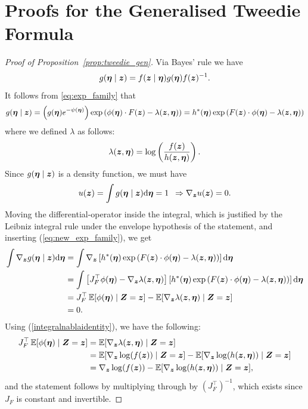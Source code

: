\documentclass{article}
\def\E{\mathbb{E}}
\def\dd{\mathrm{d}}
\def\tp{\top}
\theoremstyle{definition}
\begin{document}
\section{Proofs for the Generalised Tweedie Formula}\label{app:tweedie-proofs}
\begin{proof}[Proof of Proposition~\ref{prop:tweedie_gen}]
    Via Bayes' rule we have 
\begin{align}
g(\boldsymbol{\eta} \mid \boldsymbol{z}) = f(\boldsymbol{z} \mid \boldsymbol{\eta})g(\boldsymbol{\eta})f(\boldsymbol{z})^{-1}. \notag 
\end{align}
		It follows from \eqref{eq:exp_family} that
    \begin{align}
        g(\boldsymbol{\eta} \mid \boldsymbol{z}) = \left(g(\boldsymbol{\eta})e^{-\psi(\boldsymbol{\eta})}\right)\exp\left( \phi(\boldsymbol{\eta}) \cdot F(\boldsymbol{z}) - \lambda(\boldsymbol{z},\boldsymbol{\eta})\right) = h^*(\boldsymbol{\eta})\exp\left( F(\boldsymbol{z}) \cdot \phi(\boldsymbol{\eta}) - \lambda(\boldsymbol{z}, \boldsymbol{\eta})\right) \label{eq:new_exp_family}
    \end{align}
    where we defined $\lambda$ as follows:
    \begin{equation*}
        \lambda(\boldsymbol{z},\boldsymbol{\eta}) = \log\left(\frac{f(\boldsymbol{z})}{h(\boldsymbol{z},\boldsymbol{\eta})}\right).
    \end{equation*}
    Since $g(\boldsymbol{\eta} \mid \boldsymbol{z})$ is a density function, we must have
		\begin{align}
		u(\bfz) = \int g(\bfeta \mid \bfz) \dd \bfeta = 1 \,\,\, \Rightarrow \nabla_{\bfz}u(\bfz) = 0. \notag
		\end{align}
		Moving the differential-operator inside the integral, which is justified by the Leibniz integral rule under the envelope hypothesis of the statement, and inserting (\ref{eq:new_exp_family}), we get
	 \begin{align}
		\int \nabla_{\bfz} g(\bfeta \mid \bfz) \dd \bfeta &= \int \nabla_{\bfz} \left[h^*(\bfeta)\exp\left( F(\bfz) \cdot \phi(\bfeta) - \lambda(\bfz, \bfeta)\right)\right] \dd \bfeta \notag \\
		&= \int \left[J_F^{\tp}\phi(\bfeta) - \nabla_{\bfz}\lambda(\bfz, \bfeta)\right] \left[h^*(\bfeta)\exp\left(F(\bfz)  \cdot \phi(\bfeta) - \lambda(\bfz, \bfeta)\right)\right] \dd \bfeta \notag \\
		&=J_F^{\tp}\,\E[\phi(\bfeta) \mid \boldsymbol{Z} = \boldsymbol{z} ] - \E[\nabla_{\bfz}\lambda(\bfz, \bfeta) \mid \boldsymbol{Z} = \boldsymbol{z} ] \notag \\
		&= 0. \label{integralnablaidentity}
	\end{align}	
Using (\ref{integralnablaidentity}), we have the following:
\begin{align}
J_F^{\tp}\,\E[\phi(\bfeta) \mid \boldsymbol{Z} = \boldsymbol{z} ] &=  \E[\nabla_{\bfz}\lambda(\bfz, \bfeta) \mid \boldsymbol{Z} = \boldsymbol{z} ] \notag \\
&= \E[\nabla_{\bfz}\log(f(\bfz)) \mid \boldsymbol{Z} = \boldsymbol{z} ] - \E[\nabla_{\bfz}\log(h(\bfz,\bfeta)) \mid \boldsymbol{Z} = \boldsymbol{z} ] \notag \\
& = \nabla_{\bfz}\log(f(\bfz)) - \E[\nabla_{\bfz}\log(h(\bfz,\bfeta)) \mid \boldsymbol{Z} = \boldsymbol{z} ], \notag
\end{align}
and the statement follows by multiplying through by $(J_F^{\tp})^{-1}$, which exists since $J_F$ is constant and invertible.
\end{proof}
\end{document}
